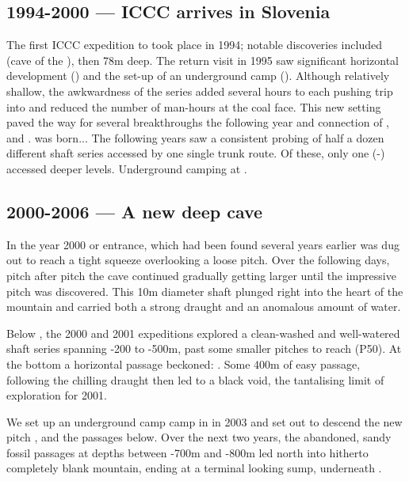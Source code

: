 \subsection{1994-2000 --- ICCC arrives in Slovenia} The first ICCC expedition to  took place in 1994; notable discoveries included  (cave of the ), then 78m deep. The return visit in 1995 saw significant horizontal development () and the set-up of an underground camp (). Although relatively shallow, the awkwardness of the  series added several hours to each pushing trip into  and reduced the number of man-hours at the coal face.
This new setting paved the way for several breakthroughs the following year and connection of ,  and .   was born... The following years saw a consistent probing of half a dozen different shaft series accessed by one single trunk route. Of these, only one (-) accessed deeper levels. Underground camping at .

\subsection{2000-2006 --- A new deep cave}

\label{sec:early vrtnarija}

 In the year 2000  or  entrance, which had been found several years earlier was dug out to reach a tight squeeze overlooking a loose pitch. Over the following days, pitch after pitch the cave continued gradually getting larger until the impressive  pitch was discovered. This 10m diameter shaft plunged right into the heart of the mountain and carried both a strong draught and an anomalous amount of water. 

Below , the 2000 and 2001 expeditions explored a clean-washed and well-watered shaft series spanning -200 to -500m, past some smaller pitches to reach  (P50). At the bottom a horizontal passage beckoned: . Some 400m of easy passage, following the chilling draught then led to a black void, the tantalising limit of exploration for 2001.
    
We set up an underground camp camp in  in 2003 and set out to descend the new pitch , and the passages below. Over the next two years, the abandoned, sandy fossil passages at depths between -700m and -800m led north into hitherto completely blank mountain, ending at a terminal looking sump, underneath .


